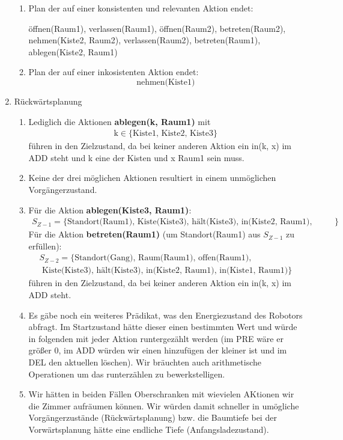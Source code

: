 \documentclass[a4paper,10pt]{article}
\begin{document}
\begin{enumerate}[~~a.)]
\begin{enumerate}[~~i)]
        \item Plan der auf einer konsistenten und relevanten Aktion endet:
        \begin{center}
         öffnen(Raum1), verlassen(Raum1), öffnen(Raum2), betreten(Raum2), \\
         nehmen(Kiste2, Raum2), verlassen(Raum2), betreten(Raum1), ablegen(Kiste2, Raum1)
        \end{center}
        \item Plan der auf einer inkosistenten Aktion endet:
        $$\textrm{nehmen(Kiste1)}$$
    \end{enumerate}
    \item Rückwärtsplanung
    \begin{enumerate}[~~i)]
    	\item Lediglich die Aktionen \textbf{ablegen(k, Raum1)} mit
    	\begin{align*}
    	\textrm{k} \in \{\textrm{Kiste1, Kiste2, Kiste3}\}
    	\end{align*}
    	führen in den Zielzustand, da bei keiner anderen Aktion ein in(k, 			x) im ADD steht und k eine der Kisten und x Raum1 sein muss. 
    	\item Keine der drei möglichen Aktionen resultiert in einem 				unmöglichen Vorgängerzustand.
    	\item Für die Aktion \textbf{ablegen(Kiste3, Raum1)}:
    	\begin{align*}
    	S_{Z-1} = \{\textrm{Standort(Raum1), Kiste(Kiste3), hält(Kiste3), 			in(Kiste2, Raum1), in(Kiste1, Raum1)}\}
    	\end{align*}
    	Für die Aktion \textbf{betreten(Raum1)} (um Standort(Raum1) aus 			$S_{Z-1}$ zu erfüllen):
    	\begin{align*}
    	S_{Z-2} = \{\textrm{Standort(Gang), Raum(Raum1), offen(Raum1),}\\ 			\textrm{ Kiste(Kiste3), hält(Kiste3), in(Kiste2, Raum1), 					in(Kiste1, Raum1)}\}
    	\end{align*}
    	führen in den Zielzustand, da bei keiner anderen Aktion ein in(k, x) im ADD steht. 
        \item Es gäbe noch ein weiteres Prädikat, was den Energiezustand des Robotors abfragt. Im Startzustand hätte dieser einen bestimmten Wert und würde in folgenden mit jeder Aktion runtergezählt werden (im PRE wäre er größer 0, im ADD würden wir einen hinzufügen der kleiner ist und im DEL den aktuellen löschen). Wir bräuchten auch arithmetische Operationen um das runterzählen zu bewerkstelligen.
        \item Wir hätten in beiden Fällen Oberschranken mit wievielen AKtionen wir die Zimmer aufräumen können. Wir würden damit schneller in umögliche Vorgängerzustände (Rückwärtsplanung) bzw. die Baumtiefe bei der Vorwärtsplanung hätte eine endliche Tiefe (Anfangsladezustand).
    \end{enumerate}
\end{enumerate}
\newpage
\end{document}
